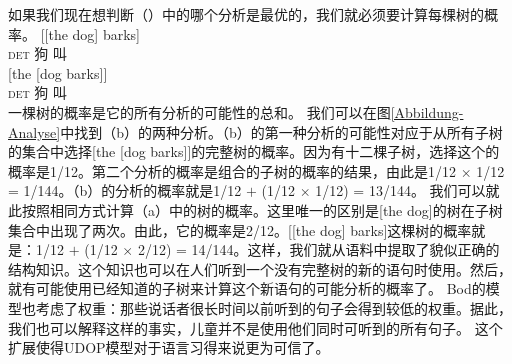 如果我们现在想判断（）中的哪个分析是最优的，我们就必须要计算每棵树的概率。
\eal
\ex \gll {}[[the dog] barks]\\
\hspaceThis{[[}\textsc{det} 狗 叫\\
\ex \gll {}[the [dog barks]]\\
         \spacebr\textsc{det} \spacebr{}狗 叫\\
\zl
一棵树的概率是它的所有分析的可能性的总和。
我们可以在图\ref{Abbildung-Analyse}中找到（b）的两种分析。（b）的第一种分析的可能性对应于从所有子树的集合中选择[the [dog barks]]的完整树的概率。因为有十二棵子树，选择这个的概率是1/12。第二个分析的概率是组合的子树的概率的结果，由此是1/12 $\times$ 1/12 = 1/144。（b）的分析的概率就是1/12 $+$ (1/12 $\times$ 1/12) = 13/144。
我们可以就此按照相同方式计算（a）中的树的概率。这里唯一的区别是[the dog]的树在子树集合中出现了两次。由此，它的概率是2/12。[[the dog] barks]这棵树的概率就是：1/12 $+$ (1/12 $\times$ 2/12) = 14/144。这样，我们就从语料中提取了貌似正确的结构知识。这个知识也可以在人们听到一个没有完整树的新的语句时使用。然后，就有可能使用已经知道的子树来计算这个新语句的可能分析的概率了。
Bod的模型也考虑了权重：那些说话者很长时间以前听到的句子会得到较低的权重。据此，我们也可以解释这样的事实，儿童并不是使用他们同时可听到的所有句子。
这个扩展使得UDOP模型对于语言习得来说更为可信了。

